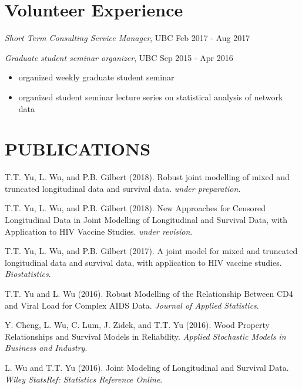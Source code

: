\documentclass[margin]{res}
\begin{document}
\begin{resume}
\section{Volunteer Experience}              

{\sl Short Term Consulting Service Manager}, UBC \hfill Feb 2017 - Aug 2017  


{\sl Graduate student seminar organizer}, UBC \hfill Sep 2015 - Apr 2016
                 \begin{itemize}  \itemsep -2pt %
                  \item organized weekly graduate student seminar
                 \item organized student seminar lecture series on statistical
                 analysis of network data
                \end{itemize}                


\section{PUBLICATIONS} %
T.T. Yu, L. Wu, and P.B. Gilbert (2018). Robust joint modelling of mixed and truncated longitudinal data  and survival data. {\em under preparation}.

T.T. Yu, L. Wu, and P.B. Gilbert (2018). New Approaches for Censored Longitudinal Data in Joint Modelling of Longitudinal and Survival Data, with Application to HIV Vaccine Studies. {\em under revision}.

T.T. Yu, L. Wu, and P.B. Gilbert (2017). A joint model for mixed and truncated longitudinal data and survival data, with application to HIV vaccine studies. {\em Biostatistics}. 

T.T. Yu and L. Wu (2016). Robust Modelling of the Relationship Between CD4 and Viral Load for Complex AIDS Data. {\em Journal of Applied Statistics}.

Y. Cheng, L. Wu, C. Lum, J. Zidek, and T.T. Yu (2016).  Wood Property Relationships and Survival Models in Reliability. {\em Applied Stochastic Models in Business and Industry}.

L. Wu and T.T. Yu (2016).  Joint Modeling of Longitudinal and Survival Data. {\em Wiley StatsRef: Statistics Reference Online}.



\end{resume}
\end{document}
